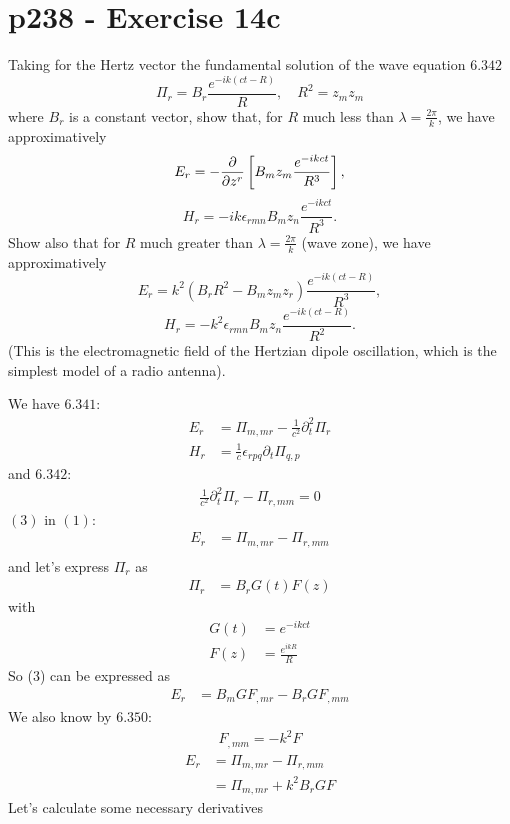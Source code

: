 \section{p238 - Exercise 14c}
\begin{tcolorbox}
Taking for the Hertz vector the fundamental solution of the wave equation $\mathbf{6.342}$
$$\Pi_r=B_r\frac{e^{-ik\left(ct-R\right)}}{R},\quad R^2=z_mz_m$$
where $B_r$ is a constant vector, show that, for $R$ much less than $\lambda=\frac{2\pi}{k}$, we have approximatively
$$E_r= -\pdv{}{z^r}\left[B_mz_m\frac{e^{-ikct}}{R^3}\right],$$
$$H_r= -ik\epsilon_{rmn}B_mz_n\frac{e^{-ikct}}{R^3}.$$
Show also that for $R$ much greater than $\lambda=\frac{2\pi}{k}$ (wave zone), we have approximatively
$$E_r= k^2\left(B_rR^2-B_mz_mz_r\right)\frac{e^{-ik(ct-R)}}{R^3},$$
$$H_r= -k^2\epsilon_{rmn}B_mz_n\frac{e^{-ik(ct-R)}}{R^2}.$$
(This is the electromagnetic field of the Hertzian dipole oscillation, which is the simplest model of a radio antenna).
\end{tcolorbox}
We have $\mathbf{6.341}$:
\begin{align}
E_r&= \Pi_{m,mr}-\frac{1}{c^2}\partial^2_t\Pi_r\\
H_r&= \frac{1}{c}\epsilon_{rpq}\partial_t\Pi_{q,p}
\end{align}
and $\mathbf{6.342}$:
\begin{align}
\frac{1}{c^2}\partial^2_t\Pi_r-\Pi_{r,mm}=0
\end{align}
$(3)$ in $(1)$:
\begin{align}
E_r&= \Pi_{m,mr}-\Pi_{r,mm}\\
\end{align}
and let's express $\Pi_r$ as 
\begin{align}
\Pi_r&= B_rG(t)F(z)
\end{align}
with
\\
\begin{align}
G(t)&=e^{-ikct}\\
F(z)&= \frac{e^{ikR}}{R}
\end{align}
So (3) can be expressed as 
\begin{align}
E_r&= B_mGF_{,mr}-B_rGF_{,mm}
\end{align}We also know by $\mathbf{6.350}$:
\begin{align}
F_{,mm}=-k^2F
\end{align}
\begin{align}
E_r&= \Pi_{m,mr}-\Pi_{r,mm}\\
&= \Pi_{m,mr}+k^2B_rGF
\end{align}
Let's calculate some necessary derivatives
